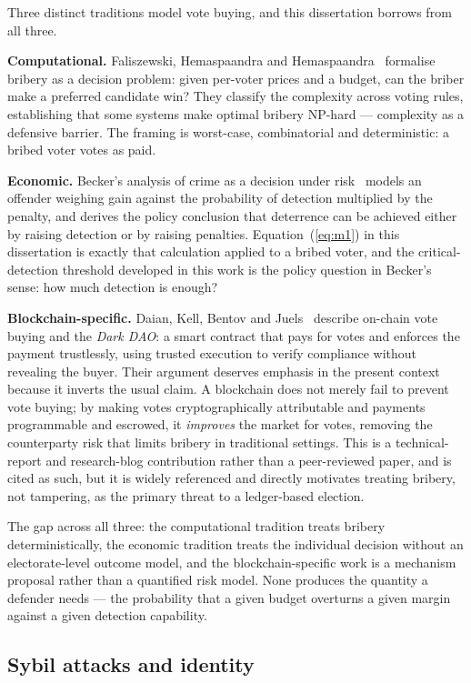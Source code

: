 Three distinct traditions model vote buying, and this dissertation
borrows from all three.

\textbf{Computational.} Faliszewski, Hemaspaandra and
Hemaspaandra~\cite{faliszewski2009} formalise bribery as a decision
problem: given per-voter prices and a budget, can the briber make a
preferred candidate win? They classify the complexity across voting
rules, establishing that some systems make optimal bribery
NP-hard --- complexity as a defensive barrier. The framing is
worst-case, combinatorial and deterministic: a bribed voter votes as
paid.

\textbf{Economic.} Becker's analysis of crime as a decision under
risk~\cite{becker1968} models an offender weighing gain against the
probability of detection multiplied by the penalty, and derives the
policy conclusion that deterrence can be achieved either by raising
detection or by raising penalties. Equation~(\ref{eq:m1}) in this
dissertation is exactly that calculation applied to a bribed voter, and
the critical-detection threshold developed in this work is the
policy question in Becker's sense: how much detection is enough?

\textbf{Blockchain-specific.} Daian, Kell, Bentov and
Juels~\cite{daian2018} describe on-chain vote buying and the
\emph{Dark DAO}: a smart contract that pays for votes and enforces the
payment trustlessly, using trusted execution to verify compliance
without revealing the buyer. Their argument deserves emphasis in the
present context because it inverts the usual claim. A blockchain does
not merely fail to prevent vote buying; by making votes cryptographically
attributable and payments programmable and escrowed, it \emph{improves}
the market for votes, removing the counterparty risk that limits bribery
in traditional settings. This is a technical-report and research-blog
contribution rather than a peer-reviewed paper, and is cited as such,
but it is widely referenced and directly motivates treating bribery,
not tampering, as the primary threat to a ledger-based election.

The gap across all three: the computational tradition treats bribery
deterministically, the economic tradition treats the individual decision
without an electorate-level outcome model, and the blockchain-specific
work is a mechanism proposal rather than a quantified risk model. None
produces the quantity a defender needs --- the probability that a given
budget overturns a given margin against a given detection capability.

\subsection{Sybil attacks and identity}
\label{sec:lit-sybil}

